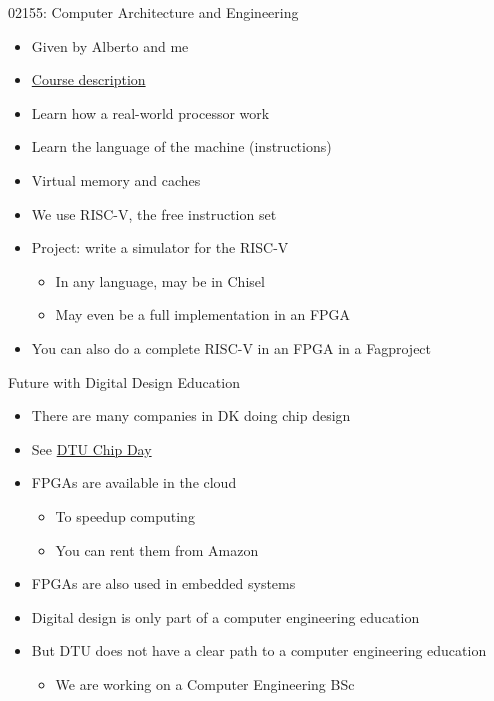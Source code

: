 \begin{frame}[fragile]{02155: Computer Architecture and Engineering}
\begin{itemize}
\item Given by Alberto and me
\item \href{http://www2.imm.dtu.dk/courses/02155/}{Course description}
\item Learn how a real-world processor work
\item Learn the language of the machine (instructions)
\item Virtual memory and caches
\item We use RISC-V, the free instruction set
\item Project: write a simulator for the RISC-V
\begin{itemize}
\item In any language, may be in Chisel
\item May even be a full implementation in an FPGA
\end{itemize}
\item You can also do a complete RISC-V in an FPGA in a Fagproject
\end{itemize}
\end{frame}

\begin{frame}[fragile]{Future with Digital Design Education}
\begin{itemize}
\item There are many companies in DK doing chip design
\item See \href{https://www.dtu.dk/english/news/all-news/nyhed?id=07dcbdbb-b948-425a-8568-7331bb271414}{DTU Chip Day}
\item FPGAs are available in the cloud
\begin{itemize}
\item To speedup computing
\item You can rent them from Amazon
\end{itemize}
\item FPGAs are also used in embedded systems
\item Digital design is only part of a computer engineering education
\item But DTU does not have a clear path to a computer engineering education
\begin{itemize}
\item We are working on a Computer Engineering BSc
\end{itemize}
\end{itemize}
\end{frame}



